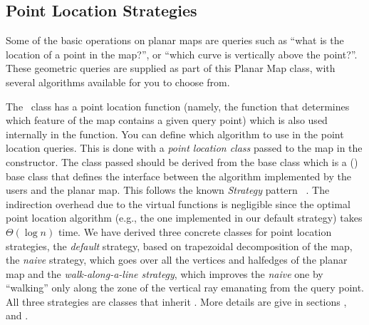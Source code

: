 \subsection{Point Location Strategies}
\label{PM_sec:point_location}
Some of the basic operations on planar maps are queries such as ``what
is the location of a point in the map?'', or ``which curve is
vertically above the point?''. These geometric queries are supplied as
part of this Planar Map class, with several algorithms available for
you to choose from.

The \ccClassTemplateName\ class has a point location function
(namely, the  function that determines which feature of the map 
contains a given query point)
which is also used internally in the  function.
You can define which algorithm to use in the
point location queries. This is done with a {\em point location class}
passed to the map in the constructor. The class passed should be derived
from the base class  which is a
() base class that defines the interface between the 
algorithm implemented by the users and the planar map. This follows the 
known {\it Strategy}
pattern ~\cite{ghjv-dpero-95}. The indirection overhead due to the virtual functions is
negligible since the optimal point location algorithm 
(e.g., the one implemented in our default strategy) takes $\Theta(\log n)$ time.  
We have derived three concrete classes for point location strategies,
the {\it default\/} strategy, based on trapezoidal decomposition of the map,
the {\it naive\/} strategy, which goes over all the vertices and halfedges
of the planar map and the {\it walk-along-a-line strategy\/}, which improves
the {\it naive\/} one by ``walking'' only along the zone of the vertical ray emanating
from the query point. All three strategies are classes
that inherit .
More details are give in sections 
  , 
   and
  .


